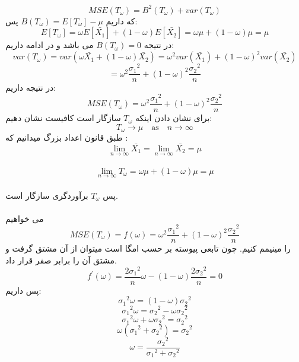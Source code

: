 \problem{}
\subproblem{}
\[
    MSE(T_{\omega}) =  B^2(T_{\omega})+var(T_{\omega})
\]
که داریم $B(T_{\omega}) = E[T_{\omega}] - \mu$ پس:\\
\[
    E[T_{\omega}] = \omega E[ \bar{X_1}]+(1-\omega)E[ \bar{X_2}]
    = \omega \mu+(1-\omega) \mu = \mu
\]
در نتیجه $B(T_{\omega}) = 0 $ می باشد و در ادامه داریم:\\
\[
    var(T_{\omega}) = var(\omega\bar{X_1}+(1-\omega)\bar{X_2})
    = \omega^2var(\bar{X_1})+(1-\omega)^2var(\bar{X_2})
\]
\[
    = \omega^2\frac{{\sigma_1}^2}{n}
    +(1-\omega)^2\frac{{\sigma_2}^2}{n}
\]
در نتیجه داریم:\\
\[
    MSE(T_{\omega}) = \omega^2\frac{{\sigma_1}^2}{n}
    +(1-\omega)^2\frac{{\sigma_2}^2}{n}
\]
\subproblem{}
برای نشان دادن اینکه $T_\omega$
سازگار است 
کافیست نشان دهیم:\\
\[
    T_{\omega} \to \mu \quad \text{as} \quad {n \to \infty}    
\]
طبق قانون اعداد بزرگ میدانیم که :\\
\[
    \lim _{n \to \infty} {\bar{X_1}} = \lim _{n \to \infty} {\bar{X_2}} =  \mu
\]\\
\[
    \lim _{n \to \infty} {T_\omega} = \omega \mu + (1-\omega) \mu = \mu
\]\\
پس $T_{\omega}$ برآوردگری سازگار است.
\\\\
\subproblem{}
می خواهیم 
\[
    MSE(T_{\omega}) = f(\omega)= \omega^2\frac{{\sigma_1}^2}{n}
    +(1-\omega)^2\frac{{\sigma_2}^2}{n}
\]
را مینیمم کنیم. چون تابعی پیوسته
بر حسب امگا است میتوان از آن مشتق گرفت و 
مشتق آن را برابر صفر قرار داد.\\
\[
    f^{\prime}(\omega) =  
    \frac{2{\sigma_1}^2}{n}\omega - (1 - \omega)\frac{2{\sigma_2}^2}{n}
    = 0
\]
پس داریم:\\
\[
    {\sigma_1}^2\omega  = (1 - \omega){\sigma_2}^2
\]
\[
    {\sigma_1}^2\omega  = {\sigma_2}^2 - \omega{\sigma_2}^2
\]
\[
    {\sigma_1}^2\omega  + \omega{\sigma_2}^2= {\sigma_2}^2 
\]
\[
    \omega({\sigma_1}^2 + {\sigma_2}^2)= {\sigma_2}^2 
\]
\[
    \omega= \frac{{\sigma_2}^2}{{\sigma_1}^2 + {\sigma_2}^2}
\]